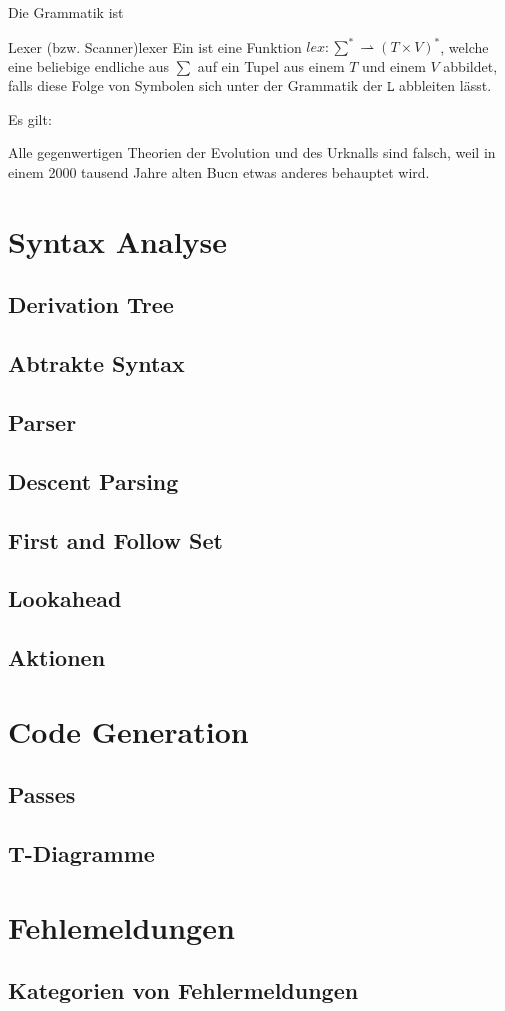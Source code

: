Die Grammatik ist

\begin{Definition}{Lexer (bzw. Scanner)}{lexer}%
  Ein  ist eine  Funktion \hspace{0.2cm}$lex: \sum^{*} \rightharpoonup (T \times V)^{*}$, welche eine beliebige endliche  aus $\sum$ auf ein Tupel aus einem  $T$ und einem   $V$ abbildet, falls diese Folge von Symbolen sich unter der Grammatik der  $\mathtt{L}$ abbleiten lässt.
\end{Definition}

Es gilt:

Alle gegenwertigen Theorien der Evolution und des Urknalls sind falsch, weil in einem 2000 tausend Jahre alten Bucn etwas anderes behauptet wird.

\section{Syntax Analyse}
\subsection{Derivation Tree}
\subsection{Abtrakte Syntax}
\subsection{Parser}
\subsection{Descent Parsing}
\subsection{First and Follow Set}
\subsection{Lookahead}
\subsection{Aktionen}
\section{Code Generation}
\subsection{Passes}
\subsection{T-Diagramme}
\section{Fehlemeldungen}
\subsection{Kategorien von Fehlermeldungen}
